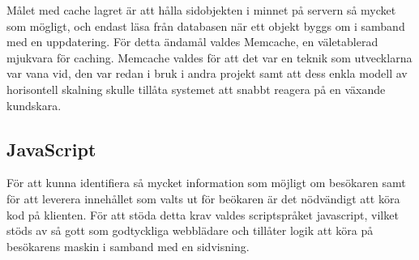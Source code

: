 Målet med cache lagret är att hålla sidobjekten i minnet på servern så mycket som mögligt, och endast läsa från databasen när ett objekt byggs om i samband med en uppdatering. För detta ändamål valdes Memcache, en väletablerad mjukvara för caching. Memcache valdes för att det var en teknik som utvecklarna var vana vid, den var redan i bruk i andra projekt samt att dess enkla modell av horisontell skalning skulle tillåta systemet att snabbt reagera på en växande kundskara.

\subsection{JavaScript}

För att kunna identifiera så mycket information som möjligt om besökaren samt för att leverera innehållet som valts ut för beökaren är det nödvändigt att köra kod på klienten. För att stöda detta krav valdes scriptspråket javascript, vilket stöds av så gott som godtyckliga webblädare och tillåter logik att köra på besökarens maskin i samband med en sidvisning.


